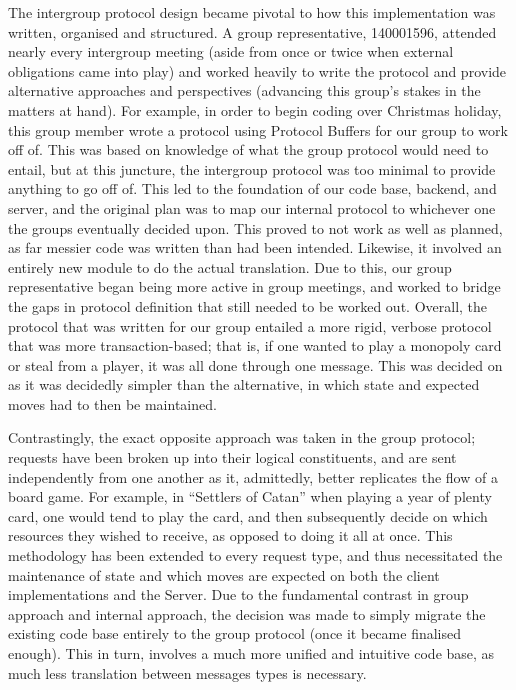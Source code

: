 \documentclass[a4paper,doc,draftfirst]{apa6}
\begin{document}
The intergroup protocol design became pivotal to how this implementation was written, organised and structured. A group representative, 140001596, attended nearly every intergroup meeting (aside from once or twice when external obligations came into play) and worked heavily to write the protocol and provide alternative approaches and perspectives (advancing this group’s stakes in the matters at hand). For example, in order to begin coding over Christmas holiday, this group member wrote a protocol using Protocol Buffers for our group to work off of. This was based on knowledge of what the group protocol would need to entail, but at this juncture, the intergroup protocol was too minimal to provide anything to go off of. This led to the foundation of our code base, backend, and server, and the original plan was to map our internal protocol to whichever one the groups eventually decided upon. This proved to not work as well as planned, as far messier code was written than had been intended. Likewise, it involved an entirely new module to do the actual translation. Due to this, our group representative began being more active in group meetings, and worked to bridge the gaps in protocol definition that still needed to be worked out. Overall, the protocol that was written for our group entailed a more rigid, verbose protocol that was more transaction-based; that is, if one wanted to play a monopoly card or steal from a player, it was all done through one message. This was decided on as it was decidedly simpler than the alternative, in which state and expected moves had to then be maintained.

Contrastingly, the exact opposite approach was taken in the group protocol; requests have been broken up into their logical constituents, and are sent independently from one another as it, admittedly, better replicates the flow of a board game. For example, in “Settlers of Catan” when playing a year of plenty card, one would tend to play the card, and then subsequently decide on which resources they wished to receive, as opposed to doing it all at once. This methodology has been extended to every request type, and thus necessitated the maintenance of state and which moves are expected on both the client implementations and the Server. Due to the fundamental contrast in group approach and internal approach, the decision was made to simply migrate the existing code base entirely to the group protocol (once it became finalised enough). This in turn, involves a much more unified and intuitive code base, as much less translation between messages types is necessary.
\end{document}
